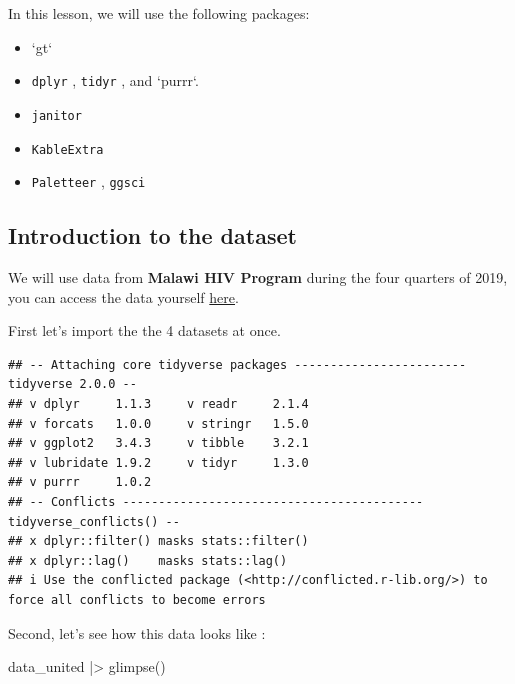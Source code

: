 \documentclass[
]{article}
\newenvironment{Shaded}{\begin{snugshade}}{\end{snugshade}}
\newcommand{\FunctionTok}[1]{\textcolor[rgb]{0.00,0.00,0.00}{#1}}
\newcommand{\NormalTok}[1]{#1}
\newcommand{\SpecialCharTok}[1]{\textcolor[rgb]{0.00,0.00,0.00}{#1}}
\begin{document}
In this lesson, we will use the following packages:

\begin{itemize}
\item
  `gt`
\item
  \texttt{dplyr} , \texttt{tidyr} , and `purrr`.
\item
  \texttt{janitor}
\item
  \texttt{KableExtra}
\item
  \texttt{Paletteer} , \texttt{ggsci}
\end{itemize}

\hypertarget{introduction-to-the-dataset}{%
\subsection{Introduction to the
dataset}\label{introduction-to-the-dataset}}

We will use data from \textbf{Malawi HIV Program} during the four
quarters of 2019, you can access the data yourself
\href{https://dms.hiv.health.gov.mw/dataset/?tags=HIV\&res_format=XLSX\&year=2019}{here}.

First let's import the the 4 datasets at once.

\begin{verbatim}
## -- Attaching core tidyverse packages ------------------------ tidyverse 2.0.0 --
## v dplyr     1.1.3     v readr     2.1.4
## v forcats   1.0.0     v stringr   1.5.0
## v ggplot2   3.4.3     v tibble    3.2.1
## v lubridate 1.9.2     v tidyr     1.3.0
## v purrr     1.0.2     
## -- Conflicts ------------------------------------------ tidyverse_conflicts() --
## x dplyr::filter() masks stats::filter()
## x dplyr::lag()    masks stats::lag()
## i Use the conflicted package (<http://conflicted.r-lib.org/>) to force all conflicts to become errors
\end{verbatim}

Second, let's see how this data looks like :

\begin{Shaded}
\begin{Highlighting}[]
\NormalTok{data\_united }\SpecialCharTok{|\textgreater{}} 
  \FunctionTok{glimpse}\NormalTok{()}
\end{Highlighting}
\end{Shaded}
\end{document}
